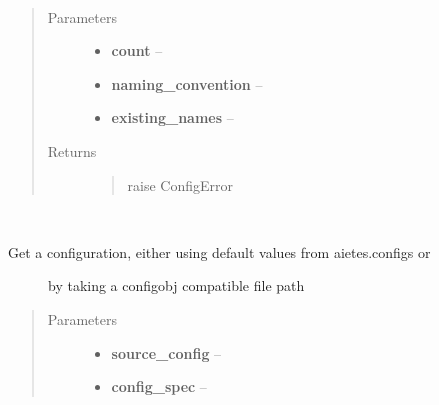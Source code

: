 \documentclass[letterpaper,10pt,english]{sphinxmanual}
\begin{document}

\begin{fulllineitems}
\label{index:aietes.Tools.generate_names}~\begin{quote}\begin{description}
\item[{Parameters}] \leavevmode\begin{itemize}
\item {} 
\textbf{count} -- 

\item {} 
\textbf{naming\_convention} -- 

\item {} 
\textbf{existing\_names} -- 

\end{itemize}

\item[{Returns}] \leavevmode
\begin{quote}\begin{description}
\item[{raise ConfigError}] \leavevmode
\end{description}\end{quote}


\end{description}\end{quote}

\end{fulllineitems}


\begin{fulllineitems}
\label{index:aietes.Tools.get_config}~\begin{description}
\item[{Get a configuration, either using default values from aietes.configs or}] \leavevmode
by taking a configobj compatible file path

\end{description}
\begin{quote}\begin{description}
\item[{Parameters}] \leavevmode\begin{itemize}
\item {} 
\textbf{source\_config} -- 

\item {} 
\textbf{config\_spec} -- 

\end{itemize}

\end{description}\end{quote}

\end{fulllineitems}
\end{document}
